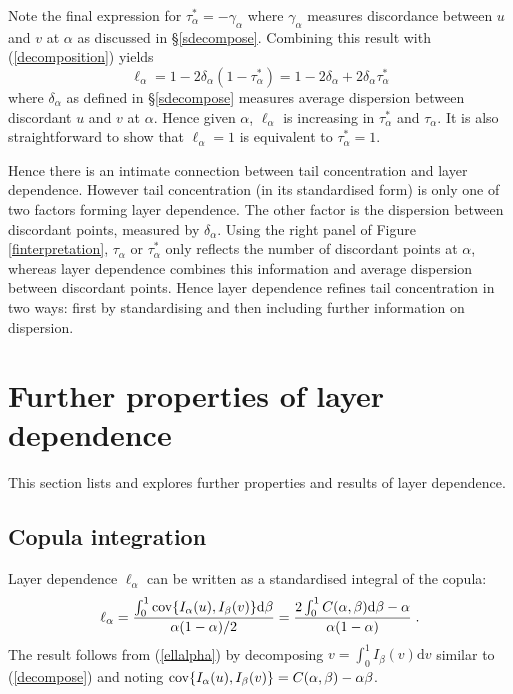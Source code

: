 \documentclass[authoryear]{elsarticle}
\newcommand{\cov}{{\rm cov}}
\newcommand{\de}{\mathrm{d}}
\newcommand{\eref}[1]{(\ref{#1})}
\newcommand{\fref}[1]{Figure \ref{#1}}
\newcommand{\sref}[1]{\S\ref{#1}}
\begin{document}
Note the final expression for $\tau_\alpha^*=-\gamma_\alpha$ where $\gamma_\alpha$ measures discordance between $u$ and $v$ at $\alpha$ as discussed in \sref{sdecompose}. Combining this result with \eref{decomposition} yields
$$
\ell_\alpha=1-2\delta_\alpha(1-\tau_\alpha^*) = 1-2\delta_\alpha + 2\delta_\alpha \tau_\alpha^*
$$
where $\delta_\alpha$ as defined in \sref{sdecompose} measures average dispersion between discordant $u$ and $v$ at $\alpha$. Hence given $\alpha$, $\ell_\alpha$ is increasing in $\tau_\alpha^*$ and $\tau_\alpha$. It is also straightforward to show that $\ell_\alpha=1$ is equivalent to $\tau_\alpha^*=1$.

Hence there is an intimate connection between tail concentration and layer dependence. However tail concentration (in its standardised form) is only one of two factors forming layer dependence. The other factor is the dispersion between discordant points, measured by $\delta_\alpha$. Using the right panel of \fref{finterpretation}, $\tau_\alpha$ or $\tau_\alpha^*$ only reflects the number of discordant points at $\alpha$, whereas layer dependence combines this information and average dispersion between discordant points. Hence layer dependence refines tail concentration in two ways: first by standardising and then including further information on dispersion.





\section{Further properties of layer dependence}\label{sproperties}

This section lists and explores further properties and results of layer dependence.




\subsection{Copula integration}

Layer dependence $\ell_\alpha$ can be written as a standardised integral of the copula:
\begin{equation}\label{copula}
\ell_\alpha = \frac{\int_0^1 \cov\{I_\alpha(u),I_\beta(v)\} \de\beta }{\alpha(1-\alpha)/2}
= \frac{2 \int_0^1 C(\alpha,\beta) \de \beta- \alpha}{\alpha(1-\alpha)} \;.
\end{equation}
The result follows from \eref{ellalpha} by decomposing $v=\int_0^1 I_\beta(v)\de v$ similar to \eref{decompose} and noting $\cov\{I_\alpha(u),I_\beta(v)\}=C(\alpha,\beta)-\alpha\beta$.
\end{document}
